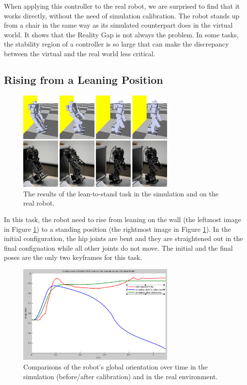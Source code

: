 When applying this controller to the real robot, we are surprised to find that it works directly, without the need of simulation calibration. The robot stands up from a chair in the same way as its simulated counterpart does in the virtual world. It shows that the Reality Gap is not always the problem. In some tasks, the stability region of a controller is so large that can make the discrepancy between the virtual and the real world less critical.

\subsection{Rising from a Leaning Position}

\begin{figure}[!t]
  \centering
  \includegraphics[width=0.7\textwidth]{figures/lean2Stand}
  \caption{The results of the lean-to-stand task in the simulation and on the real robot.}
  \label{fig:lean2Stand}
\end{figure}

In this task, the robot need to rise from leaning on the wall (the leftmost image in Figure \ref{fig:lean2Stand}) to a standing position (the rightmost image in Figure \ref{fig:lean2Stand}). In the initial configuration, the hip joints are bent and they are straightened out in the final configuation while all other joints do not move. The initial and the final poses are the only two keyframes for this task.

\begin{figure}[!t]
  \centering
  \includegraphics[width=0.7\textwidth]{figures/simRobotCompare}
  \caption{Comparisons of the robot's global orientation over time in the simulation (before/after calibration) and in the real environment.}
  \label{fig:simRobotCompare}
\end{figure}


